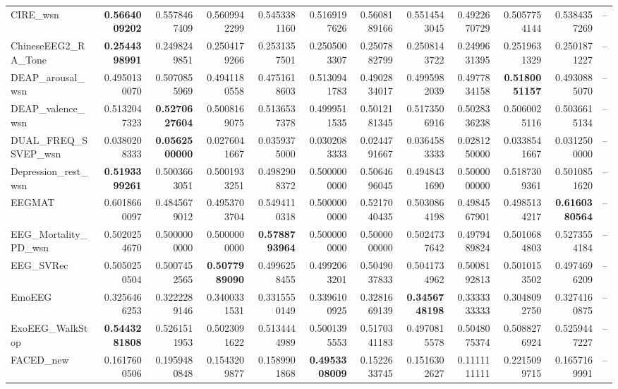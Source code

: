 \begin{table}[htbp]
\begin{tabular}{lrrrrrrrrrrr}
CIRE_wsn & \bfseries 0.5664009202 & 0.5578467409 & 0.5609942299 & 0.5453381160 & 0.5169197626 & 0.5608189166 & 0.5514543045 & 0.4922670729 & 0.5057754144 & 0.5384357269 & -- \\
ChineseEEG2_RA_Tone & \bfseries 0.2544398991 & 0.2498249851 & 0.2504179266 & 0.2531357501 & 0.2505003307 & 0.2507882799 & 0.2508143722 & 0.2499631395 & 0.2519631329 & 0.2501871227 & -- \\
DEAP_arousal_wsn & 0.4950130070 & 0.5070855969 & 0.4941180558 & 0.4751618603 & 0.5130941783 & 0.4902834017 & 0.4995982039 & 0.4977834158 & \bfseries 0.5180051157 & 0.4930885070 & -- \\
DEAP_valence_wsn & 0.5132047323 & \bfseries 0.5270627604 & 0.5008169075 & 0.5136537378 & 0.4999511535 & 0.5012181345 & 0.5173506916 & 0.5028336238 & 0.5060025116 & 0.5036615134 & -- \\
DUAL_FREQ_SSVEP_wsn & 0.0380208333 & \bfseries 0.0562500000 & 0.0276041667 & 0.0359375000 & 0.0302083333 & 0.0244791667 & 0.0364583333 & 0.0281250000 & 0.0338541667 & 0.0312500000 & -- \\
Depression_rest_wsn & \bfseries 0.5193399261 & 0.5003663051 & 0.5001933251 & 0.4982908372 & 0.5000000000 & 0.5064696045 & 0.4948431690 & 0.5000000000 & 0.5187309361 & 0.5010851620 & -- \\
EEGMAT & 0.6018660097 & 0.4845679012 & 0.4953703704 & 0.5494110318 & 0.5000000000 & 0.5217040435 & 0.5030864198 & 0.4984567901 & 0.4985134217 & \bfseries 0.6160380564 & -- \\
EEG_Mortality_PD_wsn & 0.5020254670 & 0.5000000000 & 0.5000000000 & \bfseries 0.5788793964 & 0.5000000000 & 0.5000000000 & 0.5024737642 & 0.4979489824 & 0.5010684803 & 0.5273554184 & -- \\
EEG_SVRec & 0.5050250504 & 0.5007452565 & \bfseries 0.5077989090 & 0.4996258455 & 0.4992063201 & 0.5049037833 & 0.5041734962 & 0.5008192813 & 0.5010153502 & 0.4974696209 & -- \\
EmoEEG & 0.3256466253 & 0.3222289146 & 0.3400331531 & 0.3315550149 & 0.3396100925 & 0.3281669139 & \bfseries 0.3456748198 & 0.3333333333 & 0.3048092750 & 0.3274160875 & -- \\
ExoEEG_WalkStop & \bfseries 0.5443281808 & 0.5261511953 & 0.5023091622 & 0.5134444989 & 0.5001395553 & 0.5170341183 & 0.4970815578 & 0.5048075374 & 0.5088276924 & 0.5259447227 & -- \\
FACED_new & 0.1617600506 & 0.1959480848 & 0.1543209877 & 0.1589901868 & \bfseries 0.4953308009 & 0.1522633745 & 0.1516302627 & 0.1111111111 & 0.2215099715 & 0.1657169991 & -- \\

\end{tabular}
\end{table}
